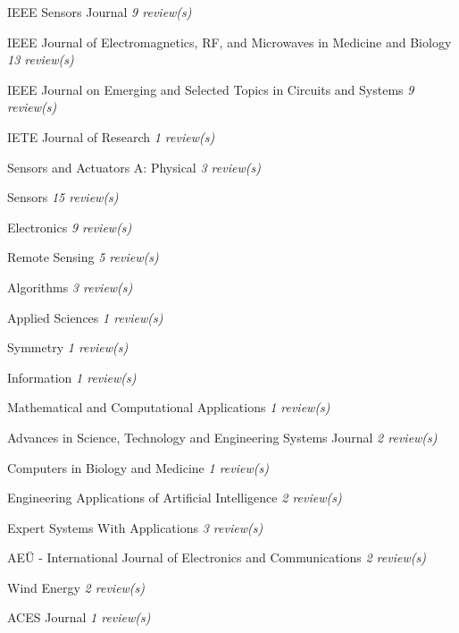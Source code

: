 {\begin{cvitems}
        \item {IEEE Sensors Journal \hfill \bodyfontlight\slshape\color{awesome} 9 review(s)}
        \item {IEEE Journal of Electromagnetics, RF, and Microwaves in Medicine and Biology \hfill \bodyfontlight\slshape\color{awesome} 13 review(s)}
        \item {IEEE Journal on Emerging and Selected Topics in Circuits and Systems \hfill \bodyfontlight\slshape\color{awesome} 9 review(s)}
        \item {IETE Journal of Research \hfill \bodyfontlight\slshape\color{awesome} 1 review(s)}
        \item {Sensors and Actuators A: Physical \hfill \bodyfontlight\slshape\color{awesome} 3 review(s)}
        \item {Sensors \hfill \bodyfontlight\slshape\color{awesome} 15 review(s)}
        \item {Electronics \hfill \bodyfontlight\slshape\color{awesome} 9 review(s)}
        \item {Remote Sensing \hfill \bodyfontlight\slshape\color{awesome} 5 review(s)}
        \item {Algorithms \hfill \bodyfontlight\slshape\color{awesome} 3 review(s)}
        \item {Applied Sciences \hfill \bodyfontlight\slshape\color{awesome} 1 review(s)}
        \item {Symmetry \hfill \bodyfontlight\slshape\color{awesome} 1 review(s)}
        \item {Information \hfill \bodyfontlight\slshape\color{awesome} 1 review(s)}
        \item {Mathematical and Computational Applications \hfill \bodyfontlight\slshape\color{awesome} 1 review(s)}
        \item {Advances in Science, Technology and Engineering Systems Journal \hfill \bodyfontlight\slshape\color{awesome} 2 review(s)}
        \item {Computers in Biology and Medicine \hfill \bodyfontlight\slshape\color{awesome} 1 review(s)}
        \item {Engineering Applications of Artificial Intelligence \hfill \bodyfontlight\slshape\color{awesome} 2 review(s)}
        \item {Expert Systems With Applications \hfill \bodyfontlight\slshape\color{awesome} 3 review(s)}
        \item {AEÜ - International Journal of Electronics and Communications \hfill \bodyfontlight\slshape\color{awesome} 2 review(s)}
        \item {Wind Energy \hfill \bodyfontlight\slshape\color{awesome} 2 review(s)}
        \item {ACES Journal \hfill \bodyfontlight\slshape\color{awesome} 1 review(s)}
        
        \vspace{4.0mm}
    \end{cvitems}
}

